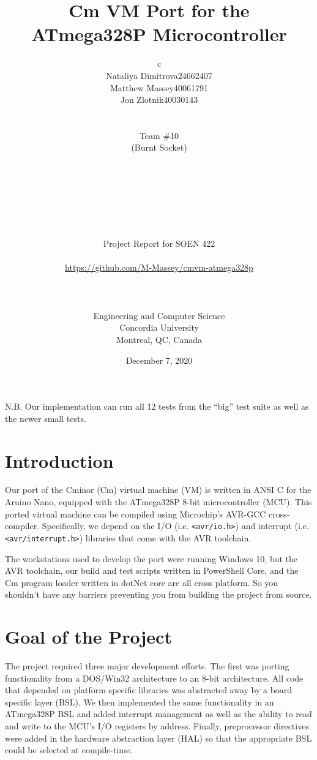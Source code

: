 \documentclass[11pt]{article}
\title{Cm VM Port for the\\ATmega328P Microcontroller}
\author{
\begin{tabular}{c}

\begin{tabular}{r l}
    Nataliya Dimitrova & 24662407 \\
    Matthew Massey & 40061791 \\
    Jon Zlotnik & 40030143
\end{tabular}\\ \\
Team \#10 \\ 
(Burnt Socket)\\ \\ \\
\\ \\ \\ \\ \\
Project Report for SOEN 422\\ \\
\url{https://github.com/M-Massey/cmvm-atmega328p}\\
\\ \\ \\
Engineering and Computer Science\\
Concordia University\\
Montreal, QC, Canada
\end{tabular}
}
\date{December 7, 2020}
\begin{document}
\maketitle
\thispagestyle{empty}

\clearpage
{} 

\tableofcontents

\vspace{10mm}

N.B. Our implementation can run all 12 tests from the ``big'' test suite as well as the newer small tests.

\newpage

\section{Introduction}


Our port of the Cminor (Cm) virtual machine (VM) is written in ANSI C for the Aruino Nano, equipped with the ATmega328P 8-bit microcontroller (MCU).
This ported virtual machine can be compiled using Microchip's AVR-GCC cross-compiler.
Specifically, we depend on the I/O (i.e. \lstinline[columns=fixed]{<avr/io.h>}) and interrupt (i.e. \lstinline[columns=fixed]{<avr/interrupt.h>}) libraries that come with the AVR toolchain.

The workstations used to develop the port were running Windows 10, but the AVR toolchain, our build and test scripts written in PowerShell Core, and the Cm program loader written in dotNet core are all cross platform.
So you shouldn't have any barriers preventing you from building the project from source.


\section{Goal of the Project}


The project required three major development efforts. The first was porting functionality from a DOS/Win32 architecture to an 8-bit architecture. 
All code that depended on platform specific libraries was abstracted away by a board specific layer (BSL). 
We then implemented the same functionality in an ATmega328P BSL and added interrupt management as well as the ability to read and write to the MCU's I/O registers by address.
Finally, preprocessor directives were added in the hardware abstraction layer (HAL) so that the appropriate BSL could be selected at compile-time.
\end{document}
